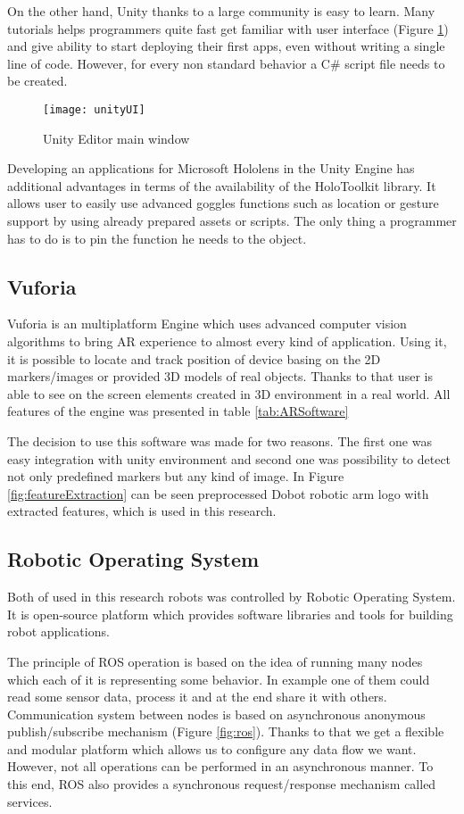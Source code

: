 \documentclass[printmode,en]{mgr}
\begin{document}
On the other hand, Unity thanks to a large community is easy to learn. Many tutorials helps programmers quite fast get familiar with user interface (Figure \ref{fig:unityUI}) and give ability to start deploying their first apps, even without writing a single line of code. However, for every non standard behavior a C\# script file needs to be created.

\begin{figure}[!ht]
  \centering
    \texttt{[image: unityUI]}
  \caption{Unity Editor main window}
  \label{fig:unityUI}
\end{figure}

Developing an applications for Microsoft Hololens in the Unity Engine has additional advantages in terms of the availability of the HoloToolkit library. It allows user to easily use advanced goggles functions such as location or gesture support by using already prepared assets or scripts. The only thing a programmer has to do is to pin the function he needs to the object.

\subsection{Vuforia}
Vuforia is an multiplatform Engine which uses advanced computer vision algorithms to bring AR experience to almost every kind of application. Using it, it is possible to locate and track position of device basing on the 2D markers/images or provided 3D models of real objects. Thanks to that user is able to see on the screen elements created in 3D environment in a real world. All features of the engine was presented in table \ref{tab:ARSoftware}

The decision to use this software was made for two reasons. The first one was easy integration with unity environment and second one was possibility to detect not only predefined markers but any kind of image. In Figure \ref{fig:featureExtraction} can be seen preprocessed Dobot robotic arm logo with extracted features, which is used in this research.

\subsection{Robotic Operating System}
Both of used in this research robots was controlled by Robotic Operating System. It is open-source platform which provides software libraries and tools for building robot applications.

The principle of ROS operation is based on the idea of running many nodes which each of it is representing some behavior. In example one of them could read some sensor data, process it and at the end share it with others. Communication system between nodes is based on asynchronous anonymous publish/subscribe mechanism (Figure \ref{fig:ros}). Thanks to that we get a flexible and modular platform which allows us to configure any data flow we want. However, not all operations can be performed in an asynchronous manner. To this end, ROS also provides a synchronous request/response mechanism called services.
\end{document}

